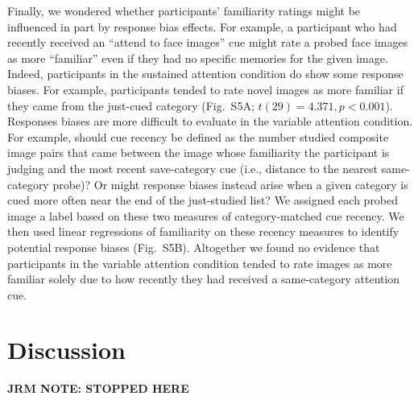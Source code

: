 \documentclass[english]{article}
\newcommand{\responseBias}{S5}
\begin{document}
Finally, we wondered whether participants' familiarity ratings might be
influenced in part by response bias effects. For example, a participant who had
recently received an ``attend to face images'' cue might rate a probed face
images as more ``familiar'' even if they had no specific memories for the given
image. Indeed, participants in the sustained attention condition do show some
response biases. For example, participants tended to rate novel images as more
familiar if they came from the just-cued category (Fig.~\responseBias A; $t(29)
= 4.371, p < 0.001$). Responses biases are more difficult to evaluate in the
variable attention condition. For example, should cue recency be defined as the
number studied composite image pairs that came between the image whose
familiarity the participant is judging and the most recent save-category cue
(i.e., distance to the nearest same-category probe)? Or might response biases
instead arise when a given category is cued more often near the end of the
just-studied list? We assigned each probed image a label based on these two
measures of category-matched cue recency. We then used linear regressions of
familiarity on these recency measures to identify potential response biases
(Fig.~\responseBias B). Altogether we found no evidence that participants in
the variable attention condition tended to rate images as more familiar solely
due to how recently they had received a same-category attention cue.

\section*{Discussion}

\textbf{JRM NOTE: STOPPED HERE}
\end{document}
